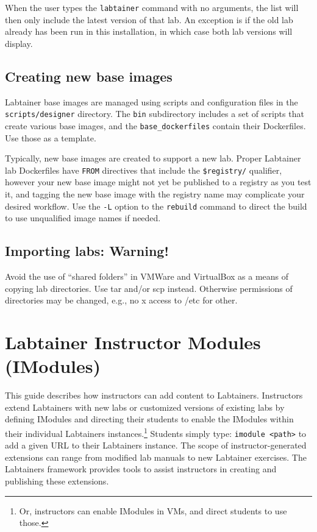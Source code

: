 \documentclass[12pt]{article}
\begin{document}
When the user types the {\tt labtainer} command with no arguments, the list will then
only include the latest version of that lab.  An exception is if the old lab already
has been run in this installation, in which case both lab versions will display.

\subsection{Creating new base images}
Labtainer base images are managed using scripts and configuration files in the {\tt scripts/designer} directory.
The {\tt bin} subdirectory includes a set of scripts that create various base images, and the
{\tt base\_dockerfiles} contain their Dockerfiles.  Use those as a template.

Typically, new base images are created to support a new lab.  Proper Labtainer lab Dockerfiles have {\tt FROM} directives
that include the {\tt \$registry/} qualifier, however your new base image might not yet be published to a registry
as you test it, and tagging the new base image with the registry name may complicate your desired workflow.  
Use the {\tt -L} option to the {\tt rebuild} command to direct the build to use unqualified image names if needed.

\subsection{Importing labs: Warning!}
\label{warnings}
Avoid the use of ``shared folders'' in VMWare and VirtualBox as a means of copying lab
directories.  Use tar and/or scp instead.  Otherwise permissions of directories may
be changed, e.g., no x access to /etc for other.


\section {Labtainer Instructor Modules (IModules)}
\label{imodules}
This guide describes how instructors can add content to Labtainers.
Instructors extend Labtainers with new labs or customized versions of existing
labs by defining IModules and directing their students to enable the IModules within
their individual Labtainers instances.\footnote{Or, instructors can enable IModules in VMs, and direct students to use those.}
Students simply type: {\tt imodule <path>} to add a given URL to their Labtainers instance.
The scope of instructor-generated extensions can range from modified lab manuals 
to new Labtainer exercises.  The Labtainers framework provides tools
to assist instructors in creating and publishing these extensions. 
\end{document}

